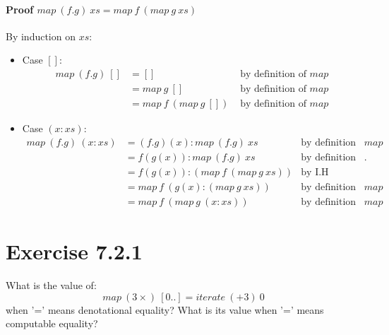 \documentclass{article}[10pt]
\begin{document}
    \paragraph{Proof $map\ (f . g)\ xs = map\ f\ (map\ g\ xs)$}
    By induction on $xs$:
    \begin{itemize}
      \item Case $[]$:
      \begin{align*}
        map\ (f . g)\ [] &= []                   &\text{ by definition of }map\\
                         &= map\ g\ []           &\text{ by definition of }map\\
                         &= map\ f\ (map\ g\ []) &\text{ by definition of }map
      \end{align*}
      \item Case $(x:xs)$:
      \begin{align*}
        map\ (f . g)\ (x:xs) &= (f . g)(x) : map\ (f . g)\ xs    &\text{by definition of }map\\
                             &= f(g(x)) : map\ (f . g)\ xs       &\text{by definition of }.\\
                             &= f(g(x)) : (map\ f\ (map\ g\ xs)) &\text{by I.H}\\
                             &= map\ f\ (g(x) : (map\ g\ xs))    &\text{by definition of }map\\
                             &= map\ f\ (map\ g\ (x:xs))         &\text{by definition of }map
      \end{align*}
    \end{itemize}
  \section{Exercise 7.2.1}
    What is the value of:
    \begin{equation*}
      map\ (3 \times)\ [0 .. ] = iterate\ (+3)\ 0
    \end{equation*}
    when '=' means denotational equality? What is its value when '=' means
    computable equality?
\end{document}
